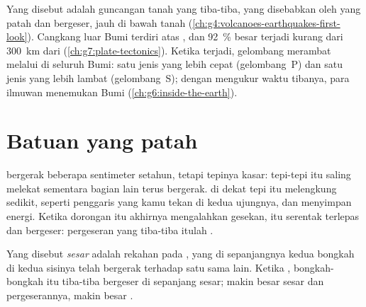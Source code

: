 \begin{recall}
Yang disebut \emph{} adalah guncangan tanah yang tiba-tiba, yang
disebabkan oleh  yang patah dan bergeser, jauh di bawah tanah
(\cref{ch:g4:volcanoes-earthquakes-first-look}). Cangkang luar Bumi terdiri
atas , dan 92~\%  besar terjadi kurang dari
\qty{300}{km} dari  (\cref{ch:g7:plate-tectonics}). Ketika
 terjadi, gelombang merambat melalui  di seluruh Bumi: satu
jenis yang lebih cepat (gelombang~P) dan satu jenis yang lebih lambat
(gelombang~S); dengan mengukur waktu tibanya, para ilmuwan menemukan 
Bumi (\cref{ch:g6:inside-the-earth}).
\end{recall}

\section{Batuan yang patah}

 bergerak beberapa sentimeter setahun, tetapi tepinya kasar:
tepi-tepi itu saling melekat sementara bagian lain  terus bergerak.
 di dekat tepi itu melengkung sedikit, seperti penggaris yang kamu
tekan di kedua ujungnya, dan menyimpan energi. Ketika dorongan itu akhirnya
mengalahkan gesekan,  itu serentak terlepas dan bergeser: pergeseran
yang tiba-tiba itulah .

\begin{definition}[Sesar]\label{def:g7:earthquakes:fault}
Yang disebut \emph{sesar} adalah rekahan pada , yang di
sepanjangnya kedua bongkah di kedua sisinya telah bergerak terhadap satu
sama lain. Ketika , bongkah-bongkah itu tiba-tiba bergeser di
sepanjang sesar; makin besar sesar dan pergeserannya, makin besar .
\end{definition}

